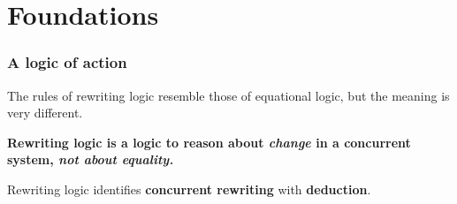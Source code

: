 \documentclass{beamer}
\begin{document}
\section{Foundations}
\begin{frame}
    \frametitle{A logic of action}
    The rules of rewriting logic resemble those of equational logic, but the meaning is very different.

    \begin{center}
        \textbf{Rewriting logic is a logic to reason about \emph{change} in a concurrent system, \emph{not about equality.}}
    \end{center}
\pause 

\bigskip 
Rewriting logic identifies \textbf{concurrent rewriting} with \textbf{deduction}.
\end{frame}
\end{document}
